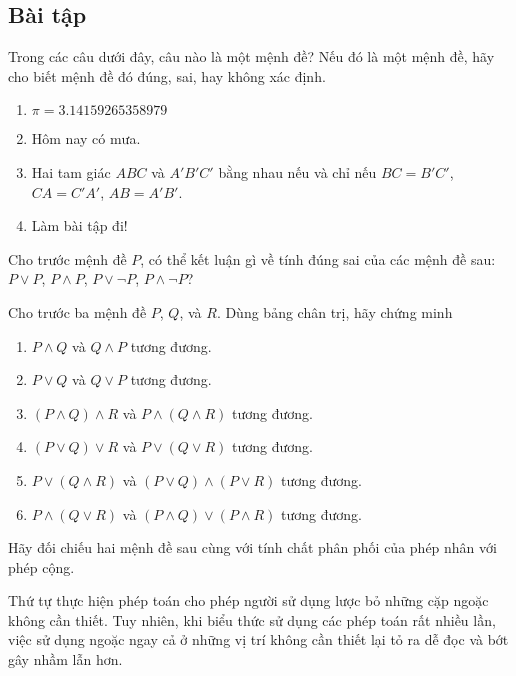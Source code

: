 \subsection*{Bài tập}
\setcounter{exercise}{0}

\begin{exercise}\label{section1:exercise1}
    Trong các câu dưới đây, câu nào là một mệnh đề? Nếu đó là một mệnh đề, hãy cho biết mệnh đề đó đúng, sai, hay không xác định.
    \begin{enumerate}[label={(\alph*)},itemsep=0pt]
        \item $\pi = 3.14159265358979$
        \item Hôm nay có mưa.
        \item Hai tam giác $ABC$ và $A'B'C'$ bằng nhau nếu và chỉ nếu $BC = B'C'$, $CA = C'A'$, $AB = A'B'$.
        \item Làm bài tập đi!
    \end{enumerate}
\end{exercise}

\begin{exercise}\label{section1:exercise2}
    Cho trước mệnh đề $P$, có thể kết luận gì về tính đúng sai của các mệnh đề sau: $P\vee P$, $P\wedge P$, $P\vee \neg P$, $P\wedge \neg P$?
\end{exercise}

\begin{exercise}\label{section1:exercise3}
    Cho trước ba mệnh đề $P$, $Q$, và $R$. Dùng bảng chân trị, hãy chứng minh
    \begin{enumerate}[label={(\alph*)},itemsep=0pt]
        \item $P\wedge Q$ và $Q\wedge P$ tương đương.
        \item $P\vee Q$ và $Q\vee P$ tương đương.
        \item $(P\wedge Q)\wedge R$ và $P\wedge (Q\wedge R)$ tương đương.
        \item $(P\vee Q)\vee R$ và $P\vee (Q\vee R)$ tương đương.
        \item $P\vee (Q\wedge R)$ và $(P\vee Q)\wedge (P\vee R)$ tương đương.
        \item $P\wedge (Q\vee R)$ và $(P\wedge Q)\vee (P\wedge R)$ tương đương.
    \end{enumerate}

    \noindent Hãy đối chiếu hai mệnh đề sau cùng với tính chất phân phối của phép nhân với phép cộng.
\end{exercise}

Thứ tự thực hiện phép toán cho phép người sử dụng lược bỏ những cặp ngoặc không cần thiết. Tuy nhiên, khi biểu thức sử dụng các phép toán rất nhiều lần, việc sử dụng ngoặc ngay cả ở những vị trí không cần thiết lại tỏ ra dễ đọc và bớt gây nhầm lẫn hơn.

